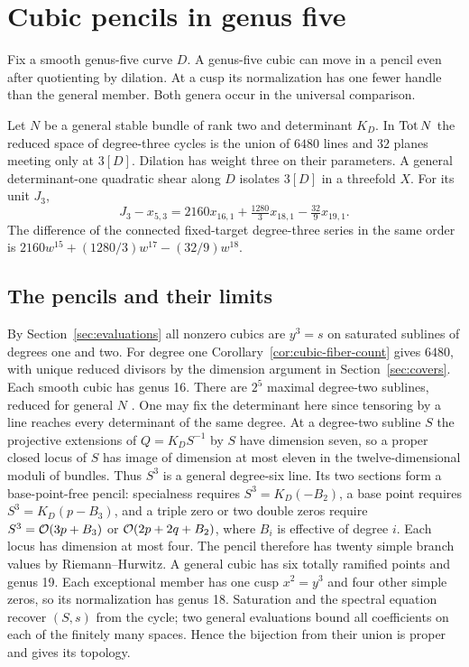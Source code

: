 \section{Cubic pencils in genus five}\label{app:pencils}

Fix a smooth genus-five curve $D$. A genus-five cubic can move in a
pencil even after quotienting by dilation. At a cusp its normalization
has one fewer handle than the general member. Both genera occur in the
universal comparison.

\begin{theorem}\label{thm:pencil}
Let $N$ be a general stable bundle of rank two and determinant $K_D$.
In $\operatorname{Tot} N$ the reduced space of degree-three cycles is the union of
$6480$ lines and $32$ planes meeting only at $3[D]$. Dilation has
weight three on their parameters. A general determinant-one quadratic
shear along $D$ isolates $3[D]$ in a threefold $X$. For its unit $J_3$,
\[
 J_3-x_{5,3}=2160x_{16,1}+\tfrac{1280}{3}x_{18,1}
                            -\tfrac{32}{9}x_{19,1}.
\]
The difference of the connected fixed-target degree-three series in
the same order is $2160w^{15}+(1280/3)w^{17}-(32/9)w^{18}$.
\end{theorem}

\subsection{The pencils and their limits}
By Section~\ref{sec:evaluations} all nonzero cubics are $y^3=s$ on
saturated sublines of degrees one and two. For degree one
Corollary~\ref{cor:cubic-fiber-count} gives $6480$, with unique
reduced divisors by the dimension argument in Section~\ref{sec:covers}.
Each smooth cubic has genus 16. There are $2^5$ maximal degree-two
sublines, reduced for general $N$ \cite[Section~4]{Gillam}. One may
fix the determinant here since tensoring by a line reaches every
determinant of the same degree. At a degree-two subline $S$ the
projective extensions of $Q=K_DS^{-1}$ by $S$ have dimension seven,
so a proper closed locus of $S$ has image of dimension at most eleven
in the twelve-dimensional moduli of bundles. Thus $S^3$ is a general
degree-six line. Its two sections form a base-point-free pencil:
specialness requires $S^3=K_D(-B_2)$, a base point requires
$S^3=K_D(p-B_3)$, and a triple zero or two double zeros require
$S^3=\mathcal O(3p+B_3)$ or $\mathcal O(2p+2q+B_2)$, where $B_i$ is effective
of degree $i$. Each locus has dimension at most four. The pencil
therefore has twenty simple branch values by Riemann--Hurwitz. A
general cubic has six totally ramified points and genus 19. Each
exceptional member has one cusp $x^2=y^3$ and four other simple
zeros, so its normalization has genus 18. Saturation and the spectral
equation recover $(S,s)$ from the cycle; two general evaluations
bound all coefficients on each of the finitely many spaces. Hence
the bijection from their union is proper and gives its topology.

